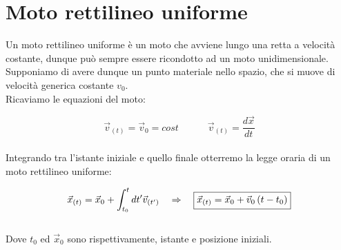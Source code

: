 \section{Moto rettilineo uniforme}
Un moto rettilineo uniforme è un moto che avviene lungo una retta
a velocità costante,
dunque può sempre essere ricondotto ad un moto unidimensionale.\\
Supponiamo di avere dunque un punto materiale nello spazio,
che si muove di velocità generica costante $v_0$.\\
Ricaviamo le equazioni del moto:

\begin{equation}
    \vec v_{(t)} = \vec v_0 = cost\quad\quad\quad
    \vec v_{(t)} = \frac{d\vec x}{dt}
\label{eq:velocity}
\end{equation}
\\
Integrando tra l'istante iniziale e quello finale otterremo la
legge oraria di un moto rettilineo uniforme:

\begin{equation}
    \vec x_{(t)} = \vec x_0 + \int_{t_0}^{t}dt' \vec v_{(t')}\quad\Rightarrow\quad
    \boxed{\vec x_{(t)} = \vec x_0 +\vec v_0\left( t - t_0\right)}
\label{eq:MRU}
\end{equation}
\\
Dove $t_0$ ed $\vec x_0$ sono rispettivamente, istante e
posizione iniziali.